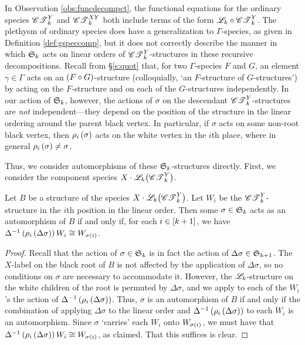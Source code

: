 \documentclass[distribution,draft]{brandiss} %
\numberwithin{section}{chapter}
\numberwithin{figure}{chapter}
\begin{document}
In Observation \ref{obs:funcdecompct}, the functional equations for the ordinary species $\mathscr{CT}_{k}^{Y}$ and $\mathscr{CT}_{k}^{XY}$ both include terms of the form $\mathscr{L}_{k} \circ \mathscr{CT}_{k}^{Y}$.
The plethysm of ordinary species does have a generalization to $\Gamma$-species, as given in Definition \ref{def:gspeccomp}, but it does not correctly describe the manner in which $ \mathfrak{S}_{k} $ acts on linear orders of $\mathscr{CT}_{k}^{Y}$-structures in these recursive decompositions.
Recall from \S \ref{s:quot} that, for two $\Gamma$-species $F$ and $G$, an element $\gamma \in \Gamma$ acts on an $\left( {F \circ G} \right)$-structure (colloquially, `an $F$-structure of $G$-structures') by acting on the $F$-structure and on each of the $G$-structures independently.
In our action of $ \mathfrak{S}_{k} $, however, the actions of $\sigma$ on the descendant $\mathscr{CT}_{k}^{Y}$-structures are \emph{not} independent---they depend on the position of the structure in the linear ordering around the parent black vertex.
In particular, if $\sigma$ acts on some non-root black vertex, then $\rho_{i} \left( {\sigma} \right)$ acts on the white vertex in the $i$th place, where in general $\rho_{i} \left( {\sigma} \right) \neq \sigma$.

Thus, we consider automorphisms of these $ \mathfrak{S}_{k} $-structures directly.
First, we consider the component species $X \cdot \specname{L}_{k} \pbracs[big]{\cty{k}}$.
\begin{lemma}
  \label{lem:ctyinvar}
  Let $B$ be a structure of the species $X \cdot \specname{L}_{k} \pbracs[big]{\cty{k}}$.
  Let $W_{i}$ be the $\mathscr{CT}_{k}^{Y}$-structure in the $i$th position in the linear order.
  Then some $\sigma \in  \mathfrak{S}_{k} $ acts as an automorphism of $B$ if and only if, for each $i \in \left[ {k+1} \right]$, we have $\Delta^{-1} \left( {\rho_{i} \left( {\Delta \sigma} \right)} \right) W_{i} \cong W_{\sigma \left( {i} \right)}$.
\end{lemma}

\begin{proof}
  Recall that the action of $\sigma \in  \mathfrak{S}_{k} $ is in fact the action of $\Delta \sigma \in  \mathfrak{S}_{k+1} $.
  The $X$-label on the black root of $B$ is not affected by the application of $\Delta \sigma$, so no conditions on $\sigma$ are necessary to accommodate it.
  However, the $\mathscr{L}_{k}$-structure on the white children of the root is permuted by $\Delta \sigma$, and we apply to each of the $W_{i}$'s the action of $\Delta^{-1} \left( {\rho_{i} \left( {\Delta \sigma} \right)} \right)$.
  Thus, $\sigma$ is an automorphism of $B$ if and only if the combination of applying $\Delta \sigma$ to the linear order and $\Delta^{-1} \left( {\rho_{i} \left( {\Delta \sigma} \right)} \right)$ to each $W_{i}$ is an automorphism.
  Since $\sigma$ `carries' each $W_{i}$ onto $W_{\sigma \left( {i} \right)}$, we must have that $\Delta^{-1} \left( {\rho_{i} \left( {\Delta \sigma} \right)} \right) W_{i} \cong W_{\sigma \left( {i} \right)}$, as claimed.
  That this suffices is clear.
\end{proof}
\end{document}

